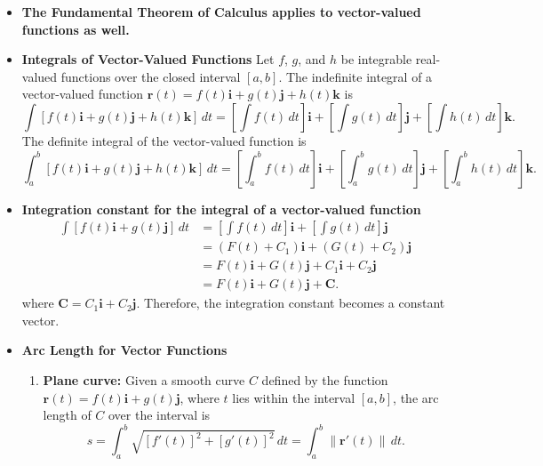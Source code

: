 \documentclass{report}
\begin{document}
\begin{itemize}
        \item \textbf{The Fundamental Theorem of Calculus applies to vector-valued functions as well.}
        \item \textbf{Integrals of Vector-Valued Functions}
            Let $f$, $g$, and $h$ be integrable real-valued functions over the closed interval $[a,b]$.
            The indefinite integral of a vector-valued function $\mathbf{r}(t) = f(t)\mathbf{i} + g(t)\mathbf{j} + h(t)\mathbf{k}$ is
            \begin{equation}
                \int [f(t)\mathbf{i} + g(t)\mathbf{j} + h(t)\mathbf{k}] \, dt = \left[ \int f(t) \, dt \right]\mathbf{i} + \left[ \int g(t) \, dt \right]\mathbf{j} + \left[ \int h(t) \, dt \right]\mathbf{k}.
            \end{equation}
            The definite integral of the vector-valued function is
            \begin{equation}
                \int_a^b [f(t)\mathbf{i} + g(t)\mathbf{j} + h(t)\mathbf{k}] \, dt = \left[ \int_a^b f(t) \, dt \right]\mathbf{i} + \left[ \int_a^b g(t) \, dt \right]\mathbf{j} + \left[ \int_a^b h(t) \, dt \right]\mathbf{k}.
            \end{equation}
        \item \textbf{Integration constant for the integral of a vector-valued function}
            \begin{align*}
                \int [f(t)\mathbf{i} + g(t)\mathbf{j}] \, dt &= \left[ \int f(t) \, dt \right]\mathbf{i} + \left[ \int g(t) \, dt \right]\mathbf{j} \\
                &= (F(t) + C_1)\mathbf{i} + (G(t) + C_2)\mathbf{j} \\
                &= F(t)\mathbf{i} + G(t)\mathbf{j} + C_1\mathbf{i} + C_2\mathbf{j} \\
                &= F(t)\mathbf{i} + G(t)\mathbf{j} + \mathbf{C}
            .\end{align*}
            where $\mathbf{C} = C_1\mathbf{i} + C_2\mathbf{j}$. Therefore, the integration constant becomes a constant vector.
            \pagebreak 
        \item \textbf{Arc Length for Vector Functions}
            \begin{enumerate}
                \item \textbf{Plane curve:} Given a smooth curve $C$ defined by the function $\mathbf{r}(t) = f(t)\mathbf{i} + g(t)\mathbf{j}$, where $t$ lies within the interval $[a,b]$, the arc length of $C$ over the interval is
                    \begin{equation}
                        s = \int_{a}^{b} \sqrt{[f'(t)]^2 + [g'(t)]^2} \, dt = \int_{a}^{b} \|\mathbf{r}'(t)\| \, dt.
                    \end{equation}


\end{enumerate}
\end{itemize}
\end{document}

